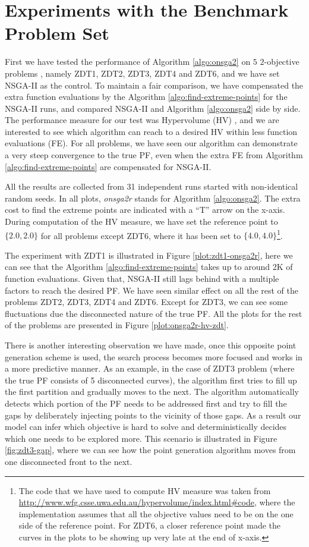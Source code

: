 \documentclass{sig-alternate-05-2015}
\begin{document}
\section{Experiments with the Benchmark Problem Set}
\label{sec:onsga2r-zdt}
First we have tested the performance of Algorithm \ref{algo:onsga2} on \(5\) \(2\)-objective problems \cite{zdt-set}, namely ZDT1, ZDT2, ZDT3, ZDT4 and ZDT6, and we have set NSGA-II as the control. To maintain a fair comparison, we have compensated the extra function evaluations by the Algorithm \ref{algo:find-extreme-points} for the NSGA-II runs, and compared NSGA-II and Algorithm \ref{algo:onsga2} side by side. The performance measure for our test was Hypervolume (HV) \cite{wfg}, and we are interested to see which algorithm can reach to a desired HV within less function evaluations (FE). For all problems, we have seen our algorithm can demonstrate a very steep convergence to the true PF, even when the extra FE from Algorithm \ref{algo:find-extreme-points} are compensated for NSGA-II. 

All the results are collected from 31 independent runs started with non-identical random seeds. In all plots, \textit{onsga2r} stands for Algorithm \ref{algo:onsga2}. The extra cost to find the extreme points are indicated with a ``T'' arrow on the x-axis. During computation of the HV measure, we have set the reference point to \(\{2.0,2.0\}\) for all problems except ZDT6, where it has been set to \(\{4.0, 4.0\}\)\footnote{The code that we have used to compute HV measure was taken from \url{http://www.wfg.csse.uwa.edu.au/hypervolume/index.html#code}, where the implementation assumes that all the objective values need to be on the one side of the reference point. For ZDT6, a closer reference point made the curves in the plots to be showing up very late at the end of x-axis.}.

The experiment with ZDT1 is illustrated in Figure \ref{plot:zdt1-onsga2r}, here we can see that the Algorithm \ref{algo:find-extreme-points} takes up to around 2K of function evaluations. Given that, NSGA-II still lags behind with a multiple factors to reach the desired PF. We have seen similar effect on all the rest of the problems ZDT2, ZDT3, ZDT4 and ZDT6. Except for ZDT3, we can see some fluctuations due the disconnected nature of the true PF. All the plots for the rest of the problems are presented in Figure \ref{plot:onsga2r-hv-zdt}.

There is another interesting observation we have made, once this opposite point generation scheme is used, the search process becomes more focused and works in a more predictive manner. As an example, in the case of ZDT3 problem (where the true PF consists of 5 disconnected curves), the algorithm first tries to fill up the first partition and gradually moves to the next. The algorithm automatically detects which portion of the PF needs to be addressed first and try to fill the gaps by deliberately injecting points to the vicinity of those gaps. As a result our model can infer which objective is hard to solve and deterministically decides which one needs to be explored more. This scenario is illustrated in Figure \ref{fig:zdt3-gap}, where we can see how the point generation algorithm moves from one disconnected front to the next.
\end{document}
